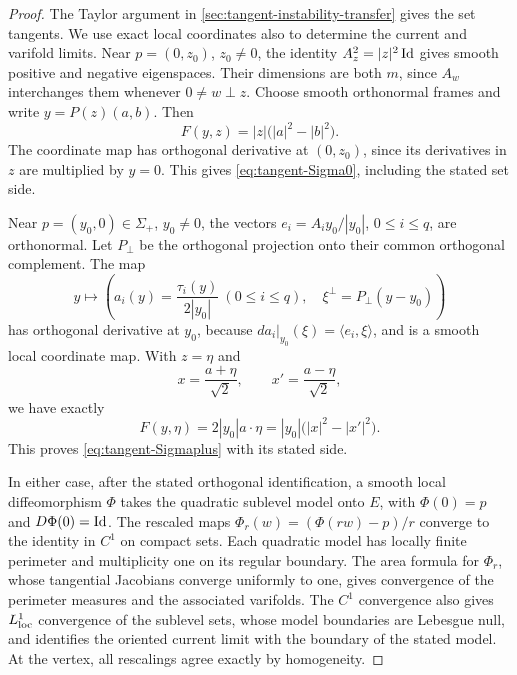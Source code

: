 \begin{proof}
The Taylor argument in \cref{sec:tangent-instability-transfer} gives
the set tangents. We use exact local coordinates also to determine
the current and varifold limits. Near
$p=(0,z_0)$, $z_0\ne0$, the identity $A_z^2=|z|^2\operatorname{Id}$ gives
smooth positive and negative eigenspaces. Their dimensions are both
$m$, since $A_w$ interchanges them whenever $0\ne w\perp z$.
Choose smooth orthonormal frames and write $y=P(z)(a,b)$. Then
\[
 F(y,z)=|z|\bigl(|a|^2-|b|^2\bigr).
\]
The coordinate map has orthogonal derivative at $(0,z_0)$, since
its derivatives in $z$ are multiplied by $y=0$. This gives
\eqref{eq:tangent-Sigma0}, including the stated set side.

Near $p=(y_0,0)\in\Sigma_+$, $y_0\ne0$, the vectors
$e_i=A_i y_0/|y_0|$, $0\le i\le q$, are orthonormal.
Let $P_\perp$ be the orthogonal projection onto their common
orthogonal complement. The map
\[
 y\longmapsto\left(
 a_i(y)=\frac{\tau_i(y)}{2|y_0|}\ (0\le i\le q),\quad
 \xi^\perp=P_\perp(y-y_0)\right)
\]
has orthogonal derivative at $y_0$, because
$da_i|_{y_0}(\xi)=\langle e_i,\xi\rangle$, and is a smooth
local coordinate map. With $z=\eta$ and
\[
 x=\frac{a+\eta}{\sqrt2},\qquad
 x'=\frac{a-\eta}{\sqrt2},
\]
we have exactly
\[
 F(y,\eta)=2|y_0|a\cdot\eta
          =|y_0|\bigl(|x|^2-|x'|^2\bigr).
\]
This proves \eqref{eq:tangent-Sigmaplus} with its stated side.

In either case, after the stated orthogonal identification, a smooth
local diffeomorphism \(\Phi\) takes the quadratic sublevel model onto
\(E\), with \(\Phi(0)=p\) and \(D\Phi(0)=\operatorname{Id}\).
The rescaled maps \(\Phi_r(w)=(\Phi(rw)-p)/r\) converge to the identity
in \(C^1\) on compact sets.  Each quadratic model has locally finite
perimeter and multiplicity one on its regular boundary.  The area
formula for \(\Phi_r\), whose tangential Jacobians converge uniformly
to one, gives convergence of the perimeter measures and the associated
varifolds.  The $C^1$ convergence also gives $L^1_{\rm loc}$ convergence of the
sublevel sets, whose model boundaries are Lebesgue null, and identifies
the oriented current limit with the boundary of the stated model.  At the vertex, all rescalings
agree exactly by homogeneity.
\end{proof}


